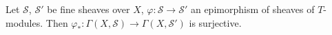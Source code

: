 Let $\mathcal{S}$, $\mathcal{S}'$ be fine sheaves over $X$, $\varphi: \mathcal{S} \rightarrow \mathcal{S}'$ an epimorphism of sheaves of $T$-modules. Then $\varphi_*: \Gamma(X, \mathcal{S}) \rightarrow \Gamma(X, \mathcal{S}')$ is surjective.
